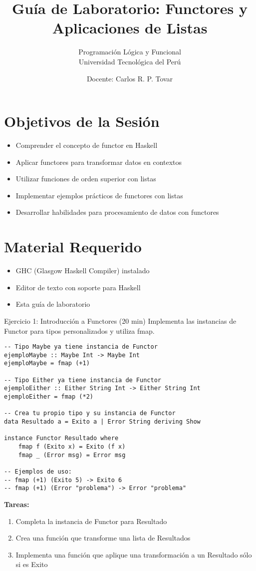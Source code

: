 \documentclass[12pt]{article}
\title{Guía de Laboratorio: Functores y Aplicaciones de Listas}
\author{Programación Lógica y Funcional \\ Universidad Tecnológica del Perú}
\date{Docente: Carlos R. P. Tovar}
\begin{document}
\maketitle

\section*{Objetivos de la Sesión}
\begin{itemize}
\item Comprender el concepto de functor en Haskell
\item Aplicar functores para transformar datos en contextos
\item Utilizar funciones de orden superior con listas
\item Implementar ejemplos prácticos de functores con listas
\item Desarrollar habilidades para procesamiento de datos con functores
\end{itemize}

\section*{Material Requerido}
\begin{itemize}
\item GHC (Glasgow Haskell Compiler) instalado
\item Editor de texto con soporte para Haskell
\item Esta guía de laboratorio
\end{itemize}

\begin{ejercicio}{Ejercicio 1: Introducción a Functores (20 min)}
Implementa las instancias de Functor para tipos personalizados y utiliza fmap.

\begin{lstlisting}[style=haskell]
-- Tipo Maybe ya tiene instancia de Functor
ejemploMaybe :: Maybe Int -> Maybe Int
ejemploMaybe = fmap (+1)

-- Tipo Either ya tiene instancia de Functor
ejemploEither :: Either String Int -> Either String Int
ejemploEither = fmap (*2)

-- Crea tu propio tipo y su instancia de Functor
data Resultado a = Exito a | Error String deriving Show

instance Functor Resultado where
    fmap f (Exito x) = Exito (f x)
    fmap _ (Error msg) = Error msg

-- Ejemplos de uso:
-- fmap (+1) (Exito 5) -> Exito 6
-- fmap (+1) (Error "problema") -> Error "problema"
\end{lstlisting}

\textbf{Tareas:}
\begin{enumerate}
\item Completa la instancia de Functor para Resultado
\item Crea una función que transforme una lista de Resultados
\item Implementa una función que aplique una transformación a un Resultado sólo si es Exito
\end{enumerate}
\end{ejercicio}
\end{document}
